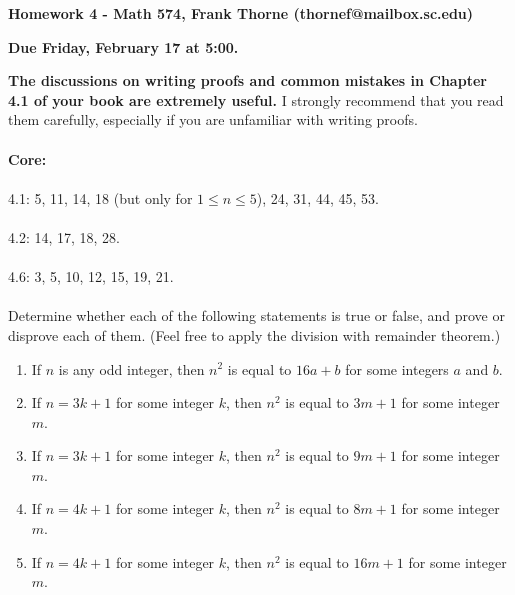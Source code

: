 \documentclass[12pt]{article}
\begin{document}
\setlength{\topmargin}{-2mm}





\begin{center}{\bf Homework 4 - Math 574, Frank Thorne (thornef@mailbox.sc.edu)}
\end{center}
\begin{center}
{\bf Due Friday, February 17 at 5:00.}
\end{center}
{\bf The discussions on writing proofs and common mistakes in Chapter 4.1 of your book are extremely useful.}
I strongly recommend that you read them carefully, especially if you are unfamiliar with writing proofs.
\\
\\
{\bf Core:}
\\
\\
4.1: 5, 11, 14, 18 (but only for $1 \leq n \leq 5$), 24, 31, 44, 45, 53.
\\
\\
4.2: 14, 17, 18, 28.
\\
\\
4.6: 3, 5, 10, 12, 15, 19, 21.
\\
\\
Determine whether each of the following statements is true or false, and prove or disprove each of them. (Feel free to apply the division with remainder
theorem.)
\begin{enumerate}
\item
If $n$ is any odd integer, then $n^2$ is equal to $16 a + b$ for some integers $a$ and $b$.

\item
If $n = 3k + 1$ for some integer $k$, then $n^2$ is equal to $3m + 1$ for some integer $m$.

\item
If $n = 3k + 1$ for some integer $k$, then $n^2$ is equal to $9m + 1$ for some integer $m$.

\item
If $n = 4k + 1$ for some integer $k$, then $n^2$ is equal to $8m + 1$ for some integer $m$.

\item
If $n = 4k + 1$ for some integer $k$, then $n^2$ is equal to $16m + 1$ for some integer $m$.
\end{enumerate}
\end{document}

